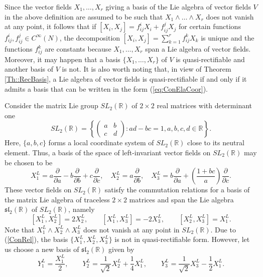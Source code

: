 \documentclass[12pt]{article}
\theoremstyle{plain}
\theoremstyle{definition}
\numberwithin{equation}{section}
\begin{document}
Since the vector fields $X_1,\ldots,X_r$ giving a basis of the Lie algebra of vector fields $V$ in the above definition are assumed to be such that $X_1\wedge \ldots\wedge X_r$ does not vanish at any point, it follows that if $[X_i,X_j]=f_{ij}^iX_i+f_{ij}^jX_j$ for certain functions $f_{ij}^i,f_{ij}^j\in C^\infty(N)$, the decomposition $[X_i,X_j]=\sum_{k=1}^r f_{ij}^kX_k$ is unique and the functions $f_{ij}^k$ are constants because $X_1,\ldots,X_r$ span a Lie algebra of vector fields. Moreover, it may happen that  a basis $\{X_1,\ldots,X_r\}$ of $V$ is quasi-rectifiable and another basis of $V$ is not. It is also worth noting that, in view of Theorem \ref{Th::RecBasis}, a Lie algebra of vector fields is quasi-rectifiable if and only if it admits a basis that can be written in the form (\ref{eq:ConElaCoor}).

Consider the matrix Lie group $SL_2(\mathbb{R})$ of $2\times 2$ real matrices with determinant one
\begin{equation}\label{Eq:SL2}
SL_2(\mathbb{R})=\left\{\left(\begin{array}{cc}a&b\\c&d\end{array}\right):ad-bc=1,a,b,c,d\in \mathbb{R}\right\}.
\end{equation}
Here, $\{a,b,c\}$ forms a local coordinate system of $SL_2(\mathbb{R})$ close to its neutral element. Thus, a basis of the space of left-invariant vector fields on $SL_2(\mathbb{R})$ may be chosen to be		$$
		X^L_1 = a\frac{\partial}{\partial a} - b \frac{\partial}{\partial b} + c \frac{\partial}{\partial c}, \quad X^L_2 = a \frac{\partial}{\partial b}, \quad X^L_3 = b \frac{\partial}{\partial a} + \left(\frac{1+bc}{a}\right) \frac{\partial}{\partial c}.
		$$
		These vector fields on $SL_2(\mathbb{R})$ satisfy the commutation relations for a basis of the matrix Lie algebra of traceless $2\times 2$ matrices and span the Lie algebra $\mathfrak{sl}_2(\mathbb{R})$ of $SL_2(\mathbb{R})$, namely
		\begin{equation}\label{ConRel}
		[X^L_1,X^L_2]=2X^L_2,\qquad [X^L_1,X^L_3]=-2X^L_3,\qquad [X^L_2,X^L_3]=X^L_1.
		\end{equation}
  Note that $X^L_1\wedge X^L_2\wedge X^L_3$ does not vanish at any point in $SL_2(\mathbb{R})$.	Due to (\ref{ConRel}), the basis $\{X^L_1,X^L_2,X^L_3\}$ is not in quasi-rectifiable form. However, let us choose a new basis of $\mathfrak{sl}_2(\mathbb{R})$ given by
  \begin{equation}\label{Eq:basis_sl2}
Y_1^L= \frac{ X_1^L}{2},\qquad Y_2^L=\frac{1}{\sqrt{2}}X_2^L+\frac{1}{4}X^L_1,\qquad Y_3^L=\frac{1}{\sqrt{2}}X_3^L-\frac{1}{2}X_1^L.
  \end{equation}
\end{document}
